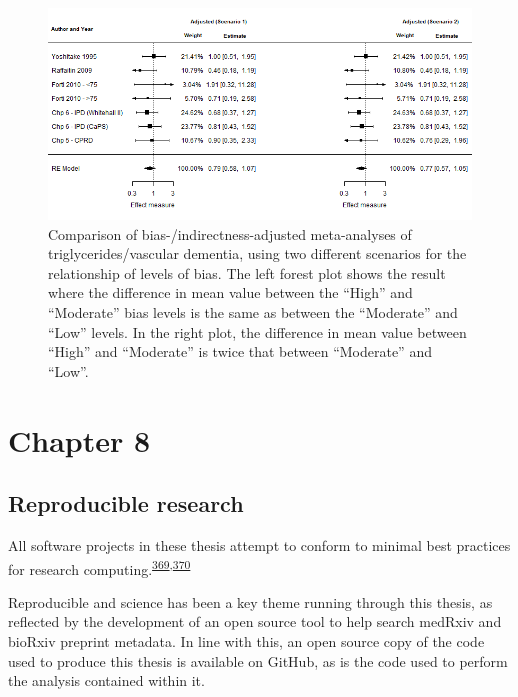 \documentclass[a4paper, twoside]{templates/ociamthesis}
\begin{document}
\begin{figure}[H]
\includegraphics[width=1\linewidth]{figures/tri/fp_paired_midlife_tg_vad_scenarios} \caption[Comparison of bias-/indirectness-adjusted meta-analyses under two different scenarios of prior distributions of bias.]{Comparison of bias-/indirectness-adjusted meta-analyses of triglycerides/vascular dementia, using two different scenarios for the relationship of levels of bias. The left forest plot shows the result where the difference in mean value between the ``High'' and ``Moderate'' bias levels is the same as between the ``Moderate'' and ``Low'' levels. In the right plot, the difference in mean value between ``High'' and ``Moderate'' is twice that between ``Moderate'' and ``Low''.}\label{fig:fpTgVaDComparison}
\end{figure}

\hypertarget{chapter-8}{%
\section{Chapter 8}\label{chapter-8}}

\hypertarget{disc-repro-research}{%
\subsection{Reproducible research}\label{disc-repro-research}}

All software projects in these thesis attempt to conform to minimal best practices for research computing.\textsuperscript{\protect\hyperlink{ref-wilson2014}{369},\protect\hyperlink{ref-wilson2017}{370}}

Reproducible and science has been a key theme running through this thesis, as reflected by the development of an open source tool to help search medRxiv and bioRxiv preprint metadata. In line with this, an open source copy of the code used to produce this thesis is available on GitHub, as is the code used to perform the analysis contained within it.
\end{document}
